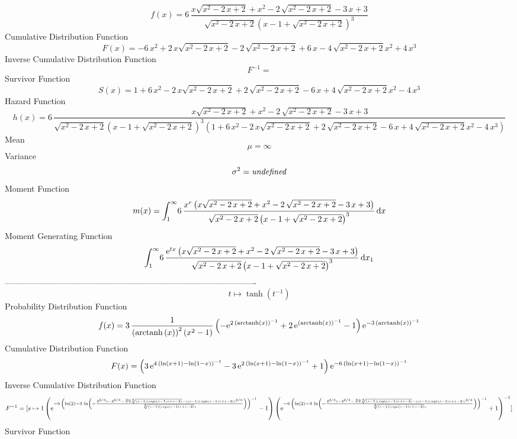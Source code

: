 \documentclass[12pt]{article}
\begin{document}
$$  f(x)=6\,{\frac {x\sqrt {{x}^{2}-2\,x+2}+{x}^{2}-2\,\sqrt {{x}^{2}-2\,x+2}-3
\,x+3}{\sqrt {{x}^{2}-2\,x+2} \left( x-1+\sqrt {{x}^{2}-2\,x+2}
 \right) ^{3}}}
$$Cumulative Distribution Function  
 $$F(x)=-6\,{x}^{2}+2\,x\sqrt {{x}^{2}-2\,x+2}-2\,\sqrt {{x}^{2}-2\,x+2}+6\,x-
4\,\sqrt {{x}^{2}-2\,x+2}{x}^{2}+4\,{x}^{3}
$$ Inverse Cumulative Distribution Function 
  $$F^{-1} =    
$$Survivor Function 
 $$ S(x)=1+6\,{x}^{2}-2\,x\sqrt {{x}^{2}-2\,x+2}+2\,\sqrt {{x}^{2}-2\,x+2}-6\,x
+4\,\sqrt {{x}^{2}-2\,x+2}{x}^{2}-4\,{x}^{3}
$$ Hazard Function 
 $$ h(x)=6\,{\frac {x\sqrt {{x}^{2}-2\,x+2}+{x}^{2}-2\,\sqrt {{x}^{2}-2\,x+2}-3
\,x+3}{\sqrt {{x}^{2}-2\,x+2} \left( x-1+\sqrt {{x}^{2}-2\,x+2}
 \right) ^{3} \left( 1+6\,{x}^{2}-2\,x\sqrt {{x}^{2}-2\,x+2}+2\,\sqrt 
{{x}^{2}-2\,x+2}-6\,x+4\,\sqrt {{x}^{2}-2\,x+2}{x}^{2}-4\,{x}^{3}
 \right) }}
$$Mean 
 $$ \mu=\infty 
$$ Variance 
 $$ \sigma^2 = {\it undefined}
$$Moment Function 
 $$ m(x) = \int_{1}^{\infty }\!6\,{\frac {{x}^{r} \left( x\sqrt {{x}^{2}-2\,x+2}+
{x}^{2}-2\,\sqrt {{x}^{2}-2\,x+2}-3\,x+3 \right) }{\sqrt {{x}^{2}-2\,x
+2} \left( x-1+\sqrt {{x}^{2}-2\,x+2} \right) ^{3}}}\,{\rm d}x
$$ Moment Generating Function 
 $$\int_{1}^{\infty }\!6\,{\frac {{{\rm e}^{tx}} \left( x\sqrt {{x}^{2}-2
\,x+2}+{x}^{2}-2\,\sqrt {{x}^{2}-2\,x+2}-3\,x+3 \right) }{\sqrt {{x}^{
2}-2\,x+2} \left( x-1+\sqrt {{x}^{2}-2\,x+2} \right) ^{3}}}\,{\rm d}x_
{{1}}
$$-------------------------------------------------------------------------------------------  \\$$t\mapsto \tanh \left( {t}^{-1} \right) 
$$Probability Distribution Function 
$$  f(x)=3\,{\frac {1}{ \left( {\rm arctanh} \left(x\right) \right) ^{2}
 \left( {x}^{2}-1 \right) } \left( -{{\rm e}^{2\, \left( {\rm arctanh}
 \left(x\right) \right) ^{-1}}}+2\,{{\rm e}^{ \left( {\rm arctanh} 
\left(x\right) \right) ^{-1}}}-1 \right) {{\rm e}^{-3\, \left( 
{\rm arctanh} \left(x\right) \right) ^{-1}}}}
$$Cumulative Distribution Function  
 $$F(x)= \left( 3\,{{\rm e}^{4\, \left( \ln  \left( x+1 \right) -\ln  \left( 1
-x \right)  \right) ^{-1}}}-3\,{{\rm e}^{2\, \left( \ln  \left( x+1
 \right) -\ln  \left( 1-x \right)  \right) ^{-1}}}+1 \right) {{\rm e}^
{-6\, \left( \ln  \left( x+1 \right) -\ln  \left( 1-x \right) 
 \right) ^{-1}}}
$$ Inverse Cumulative Distribution Function 
  $$F^{-1} = [s\mapsto {1 \left( {{\rm e}^{-6\, \left( \ln  \left( 2 \right) -3\,
\ln  \left( -{\frac {{2}^{2/3}s-{2}^{2/3}-\sqrt [3]{2}\sqrt [3]{
 \left( s-1 \right)  \left( {\it csgn} \left( s-1 \right) s+s-2
 \right) }- \left(  \left( s-1 \right)  \left( {\it csgn} \left( s-1
 \right) s+s-2 \right)  \right) ^{2/3}}{\sqrt [3]{ \left( s-1 \right) 
 \left( {\it csgn} \left( s-1 \right) s+s-2 \right) }s}} \right) 
 \right) ^{-1}}}-1 \right)  \left( {{\rm e}^{-6\, \left( \ln  \left( 2
 \right) -3\,\ln  \left( -{\frac {{2}^{2/3}s-{2}^{2/3}-\sqrt [3]{2}
\sqrt [3]{ \left( s-1 \right)  \left( {\it csgn} \left( s-1 \right) s+
s-2 \right) }- \left(  \left( s-1 \right)  \left( {\it csgn} \left( s-
1 \right) s+s-2 \right)  \right) ^{2/3}}{\sqrt [3]{ \left( s-1
 \right)  \left( {\it csgn} \left( s-1 \right) s+s-2 \right) }s}}
 \right)  \right) ^{-1}}}+1 \right) ^{-1}}]
$$Survivor Function 
\end{document}

